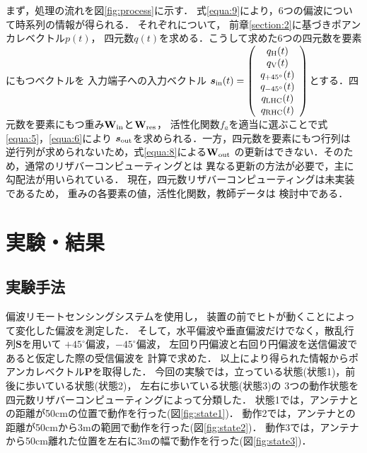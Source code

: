 \documentclass[uplatex,a4paper]{jsarticle}
\begin{document}
まず，処理の流れを図\ref{fig:process}に示す．
式\ref{equa:9}により，6つの偏波について時系列の情報が得られる．
それぞれについて，
前章\ref{section:2}に基づきポアンカレベクトル$p(t)$，
四元数$q(t)$を求める．こうして求めた6つの四元数を要素にもつベクトルを
入力端子への入力ベクトル
$\bm{s}_{\rm{in}}(t) = 
\left(
    \begin{array}{c}
        q_{\rm{H}}(t)\\
        q_{\rm{V}}(t)\\
        q_{+45^\circ}(t)\\
        q_{-45^\circ}(t)\\
        q_{\rm{LHC}}(t)\\
        q_{\rm{RHC}}(t)
    \end{array}
\right)$とする．四元数を要素にもつ重み$\bf{W_{\rm{in}}}$と$\bf{W_{\rm{res}}}$，
活性化関数$f_a$を適当に選ぶことで式\ref{equa:5}，\ref{equa:6}により
$\bm{s}_{\rm{out}}$を求められる．一方，四元数を要素にもつ行列は
逆行列が求められないため，式\ref{equa:8}による$\bf{W_{\rm{out}}}$
の更新はできない．そのため，通常のリザバーコンピューティングとは
異なる更新の方法が必要で，主に勾配法が用いられている\cite{quaternion1}\cite{quaternion2}．
現在，四元数リザバーコンピューティングは未実装であるため，
重みの各要素の値，活性化関数，教師データは
検討中である．


\section{実験・結果}
\subsection{実験手法}
偏波リモートセンシングシステムを使用し，
装置の前でヒトが動くことによって変化した偏波を測定した．
そして，水平偏波や垂直偏波だけでなく，散乱行列$\bm{S}$を用いて
$+45^\circ$偏波，$-45^\circ$偏波，
左回り円偏波と右回り円偏波を送信偏波であると仮定した際の受信偏波を
計算で求めた．
以上により得られた情報からポアンカレベクトル$\bm{P}$を取得した．
今回の実験では，立っている状態(状態1)，前後に歩いている状態(状態2)，
左右に歩いている状態(状態3)の
3つの動作状態を四元数リザバーコンピューティングによって分類した．
状態1では，アンテナとの距離が50cmの位置で動作を行った(図\ref{fig:state1})．
動作2では，アンテナとの距離が50cmから3mの範囲で動作を行った(図\ref{fig:state2})．
動作3では，アンテナから50cm離れた位置を左右に3mの幅で動作を行った(図\ref{fig:state3})．
\end{document}

